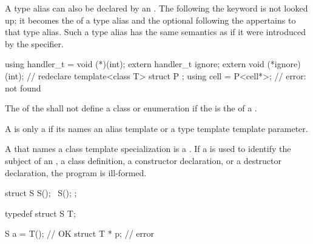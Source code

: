 \pnum
A type alias can also be declared by an
. The  following the
 keyword is not looked up;
it becomes the  of a type alias
and the optional  following the
 appertains to that type alias.
Such a type alias has the same
semantics as if it were introduced by the  specifier.
\begin{example}
\begin{codeblock}
using handler_t = void (*)(int);
extern handler_t ignore;
extern void (*ignore)(int);         // redeclare 
template<class T> struct P { };
using cell = P<cell*>;              // error:  not found
\end{codeblock}
\end{example}
The 
of the  shall not define
a class or enumeration if the 
is the  of a .

\pnum
{}%
A  is only a 
if its  names
an alias template or a type template template parameter.
\begin{note}
A  that names a class template specialization
is a .
If a  is used to identify the subject of an
, a class
definition, a constructor
declaration, or a destructor
declaration, the program is ill-formed.
\end{note}
\begin{example}
\begin{codeblock}
struct S {
  S();
  ~S();
};

typedef struct S T;

S a = T();                      // OK
struct T * p;                   // error
\end{codeblock}
\end{example}


